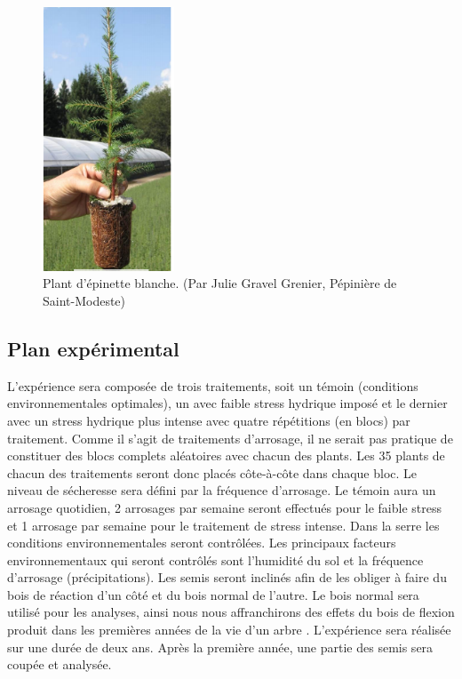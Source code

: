 \documentclass{report}
\begin{document}
\begin{figure}
	
	\centering
	\includegraphics[width=0.35\textwidth]{plant_epinette.png}
	\caption{Plant d'épinette blanche. (Par Julie Gravel Grenier, Pépinière de Saint-Modeste)}
	\label{plant}	
	
\end{figure}

\subsection*{Plan expérimental}

L'expérience sera composée de trois traitements, soit un témoin (conditions environnementales optimales), un avec faible stress hydrique imposé et le dernier avec un stress hydrique plus intense avec quatre répétitions (en blocs) par traitement. Comme il s'agit de traitements d'arrosage, il ne serait pas pratique de constituer des blocs complets aléatoires avec chacun des plants. Les 35 plants de chacun des traitements seront donc placés côte-à-côte dans chaque bloc.
 Le niveau de sécheresse sera défini par la fréquence d'arrosage. Le témoin aura un arrosage quotidien, 2 arrosages par semaine seront effectués pour le faible stress et 1 arrosage par semaine pour le traitement de stress intense. Dans la serre les conditions environnementales seront contrôlées. Les principaux facteurs environnementaux qui seront contrôlés sont l'humidité du sol et la fréquence d'arrosage (précipitations). Les semis seront inclinés afin de les obliger à faire du bois de réaction d'un côté et du bois normal de l'autre. Le bois normal sera utilisé pour les analyses, ainsi nous nous affranchirons des effets du bois de flexion produit dans les premières années de la vie d'un arbre \citep{Telewski1989}. L'expérience sera réalisée sur une durée de deux ans. Après la première année, une partie des semis sera coupée et analysée.
\end{document}
